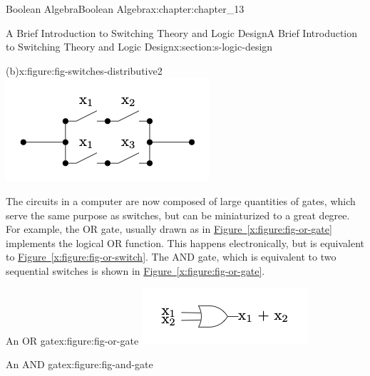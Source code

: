 \documentclass[oneside,10pt,]{book}
\newcommand{\xreffont}{\relax}
\numberwithin{equation}{section}
\begin{document}
\begin{chapterptx}{Boolean Algebra}{}{Boolean Algebra}{}{}{x:chapter:chapter_13}
\begin{sectionptx}{A Brief Introduction to Switching Theory and Logic Design}{}{A Brief Introduction to Switching Theory and Logic Design}{}{}{x:section:s-logic-design}
\begin{sidebyside}{2}{0}{0}{0}
\begin{sbspanel}{0.5}
\begin{figureptx}{(b)}{x:figure:fig-switches-distributive2}{}
\includegraphics[width=\linewidth]{images/fig-switches-distributive2.png}
\tcblower
\end{figureptx}%
\end{sbspanel}%
\end{sidebyside}%
\par
The circuits in a computer are now composed of large quantities of gates, which serve the same purpose as switches, but can be miniaturized to a great degree.   For example, the OR gate, usually drawn as in \hyperref[x:figure:fig-or-gate]{Figure~{\xreffont\ref{x:figure:fig-or-gate}}} implements the logical OR function.  This happens electronically, but is equivalent to \hyperref[x:figure:fig-or-switch]{Figure~{\xreffont\ref{x:figure:fig-or-switch}}}.  The AND gate, which is equivalent to two sequential switches is  shown in \hyperref[x:figure:fig-or-gate]{Figure~{\xreffont\ref{x:figure:fig-or-gate}}}.%
\begin{sidebyside}{2}{0}{0}{0}%
\begin{sbspanel}{0.5}%
\begin{figureptx}{An OR gate}{x:figure:fig-or-gate}{}%
\includegraphics[width=\linewidth]{images/fig-or-gate.png}
\tcblower
\end{figureptx}%
\end{sbspanel}%
\begin{sbspanel}{0.5}%
\begin{figureptx}{An AND gate}{x:figure:fig-and-gate}{}%

\end{figureptx}
\end{sbspanel}
\end{sidebyside}
\end{sectionptx}
\end{chapterptx}
\end{document}
